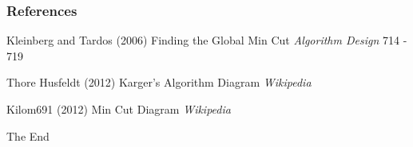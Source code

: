 \documentclass{beamer}
\begin{document}
\begin{frame}
\frametitle{References}
\footnotesize{
\begin{thebibliography}{99} %
 Kleinberg and Tardos (2006)
\newblock Finding the Global Min Cut
\newblock \emph{Algorithm Design} 714 - 719



 Thore Husfeldt  (2012)
\newblock Karger's Algorithm Diagram
\newblock \emph{Wikipedia} 

 Kilom691 (2012)
\newblock Min Cut Diagram
\newblock \emph{Wikipedia} 


\end{thebibliography}
}
\end{frame}



\begin{frame}
\Huge{\centerline{The End}}
\end{frame}

\end{document}
